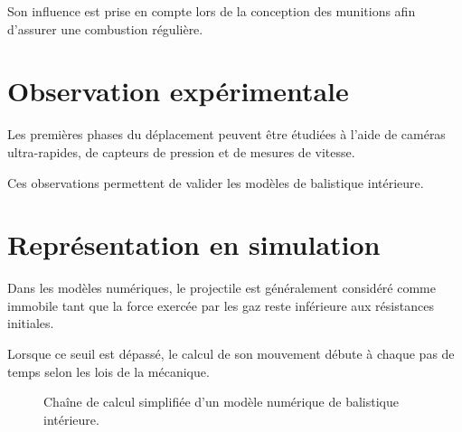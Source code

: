 Son influence est prise en compte lors de la conception des munitions afin
d'assurer une combustion régulière.

\section{Observation expérimentale}

Les premières phases du déplacement peuvent être étudiées à l'aide de
caméras ultra-rapides, de capteurs de pression et de mesures de vitesse.

Ces observations permettent de valider les modèles de balistique intérieure.

\section{Représentation en simulation}

\begin{simulation}

Dans les modèles numériques, le projectile est généralement considéré comme
immobile tant que la force exercée par les gaz reste inférieure aux résistances
initiales.

Lorsque ce seuil est dépassé, le calcul de son mouvement débute à chaque pas de
temps selon les lois de la mécanique.

\end{simulation}

\begin{figure}[htbp]
\centering


\caption{Chaîne de calcul simplifiée d'un modèle numérique de balistique intérieure.}
\label{fig:chaine_calcul}

\end{figure}

